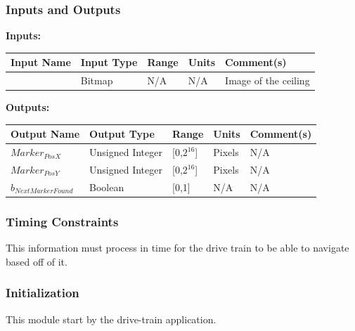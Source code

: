 \documentclass [10pt]{article}
\begin{document}

\subsubsection{Inputs and Outputs}

\textbf{Inputs: } \\

\begin{longtable}{|l|l|l|l|l|}\hline 
	\rowcolor{tableCell}\textbf{Input Name} & \textbf{Input Type} & \textbf{Range} & \textbf{Units} & \textbf{Comment(s)} \\ \hline
	 & Bitmap &  N/A & N/A & Image of the ceiling  \\ \hline
\end{longtable}

\textbf{Outputs: } \\

\begin{longtable}{|l|l|l|l|l|}\hline 
	\rowcolor{tableCell}\textbf{Output Name} & \textbf{Output Type} & \textbf{Range} & \textbf{Units} & \textbf{Comment(s)} \\ \hline
	$ Marker_{PosX} $ & Unsigned Integer & [0,$2^{16}$] & Pixels &  N/A\\ \hline
	\rowcolor{tableCell}$ Marker_{PosY} $ & Unsigned Integer & [0,$2^{16}$] & Pixels & N/A\\ \hline
	$ b_{NextMarkerFound} $ & Boolean & [0,1] & N/A & N/A\\ \hline
\end{longtable}


\subsubsection{Timing Constraints}
This information must process in time for the drive train to be able to navigate based off of it.


\subsubsection{Initialization}
This module start by the drive-train application.
\end{document}
